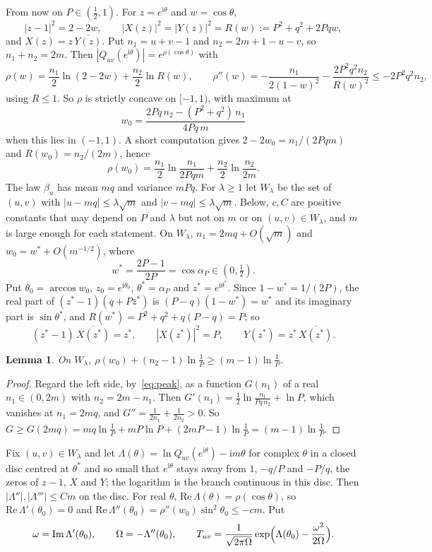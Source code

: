 \documentclass[11pt]{amsart}
\newtheorem{lemma}[theorem]{Lemma}
\theoremstyle{remark}
\newcommand{\ii}{\mathrm{i}}
\begin{document}
From now on $P\in(\frac12,1)$. For $z=e^{\ii\theta}$ and $w=\cos\theta$,
\[
|z-1|^2=2-2w,\qquad |X(z)|^2=|Y(z)|^2=R(w):=P^2+q^2+2Pqw,
\]
and $X(z)=z\,\overline{Y(z)}$. Put $n_1=u+v-1$ and $n_2=2m+1-u-v$, so $n_1+n_2=2m$. Then
$|Q_{uv}(e^{\ii\theta})|=e^{\rho(\cos\theta)}$ with
\[
\rho(w)=\frac{n_1}2\ln(2-2w)+\frac{n_2}2\ln R(w),\qquad
\rho''(w)=-\frac{n_1}{2(1-w)^2}-\frac{2P^2q^2n_2}{R(w)^2}\le-2P^2q^2n_2 ,
\]
using $R\le1$. So $\rho$ is strictly concave on $[-1,1)$, with maximum at
\[
w_0=\frac{2Pq\,n_2-(P^2+q^2)\,n_1}{4Pq\,m}
\]
when this lies in $(-1,1)$. A short computation gives $2-2w_0=n_1/(2Pqm)$ and $R(w_0)=n_2/(2m)$, hence
\begin{equation}\label{eq:peak}
\rho(w_0)=\frac{n_1}2\ln\frac{n_1}{2Pqm}+\frac{n_2}2\ln\frac{n_2}{2m}.
\end{equation}
The law $\beta_u$ has mean $mq$ and variance $mPq$. For $\lambda\ge1$ let $W_\lambda$ be the set of $(u,v)$ with
$|u-mq|\le\lambda\sqrt m$ and $|v-mq|\le\lambda\sqrt m$. Below, $c,C$ are positive constants that may depend on $P$
and $\lambda$ but not on $m$ or on $(u,v)\in W_\lambda$, and $m$ is large enough for each statement. On $W_\lambda$,
$n_1=2mq+O(\sqrt m)$ and $w_0=w^*+O(m^{-1/2})$, where
\[
w^*=\frac{2P-1}{2P}=\cos\alpha_P\in(0,\tfrac12).
\]
Put $\theta_0=\arccos w_0$, $z_0=e^{\ii\theta_0}$, $\theta^*=\alpha_P$ and $z^*=e^{\ii\theta^*}$. Since
$1-w^*=1/(2P)$, the real part of $(z^*-1)(q+P\bar z^*)$ is $(P-q)(1-w^*)=w^*$ and its imaginary part is $\sin\theta^*$, and
$R(w^*)=P^2+q^2+q(P-q)=P$; so
\begin{equation}\label{eq:ident}
(z^*-1)\,\overline{X(z^*)}=z^*,\qquad |X(z^*)|^2=P,\qquad Y(z^*)=z^*\,\overline{X(z^*)} .
\end{equation}

\begin{lemma}\label{lem:exponent}
On $W_\lambda$, $\rho(w_0)+(n_2-1)\ln\frac1P\ge(m-1)\ln\frac1P$.
\end{lemma}

\begin{proof}
Regard the left side, by~\eqref{eq:peak}, as a function $G(n_1)$ of a real $n_1\in(0,2m)$ with $n_2=2m-n_1$. Then
$G'(n_1)=\frac12\ln\frac{n_1}{Pq\,n_2}+\ln P$, which vanishes at $n_1=2mq$, and $G''=\frac1{2n_1}+\frac1{2n_2}>0$.
So $G\ge G(2mq)=mq\ln\frac1P+mP\ln P+(2mP-1)\ln\frac1P=(m-1)\ln\frac1P$.
\end{proof}

Fix $(u,v)\in W_\lambda$ and let $\Lambda(\theta)=\ln Q_{uv}(e^{\ii\theta})-\ii m\theta$ for complex $\theta$ in a closed
disc centred at $\theta^*$ and so small that $e^{\ii\theta}$ stays away from $1$, $-q/P$ and $-P/q$,
the zeros of $z-1$, $X$ and $Y$; the logarithm is the branch continuous in this disc. Then $|\Lambda''|,|\Lambda'''|\le Cm$
on the disc. For real $\theta$, $\mathrm{Re}\,\Lambda(\theta)=\rho(\cos\theta)$, so $\mathrm{Re}\,\Lambda'(\theta_0)=0$ and
$\mathrm{Re}\,\Lambda''(\theta_0)=\rho''(w_0)\sin^2\theta_0\le-cm$. Put
\[
\omega=\mathrm{Im}\,\Lambda'(\theta_0),\qquad \Omega=-\Lambda''(\theta_0),\qquad
T_{uv}=\frac{1}{\sqrt{2\pi\Omega}}\exp\Bigl(\Lambda(\theta_0)-\frac{\omega^2}{2\Omega}\Bigr).
\]
\end{document}
